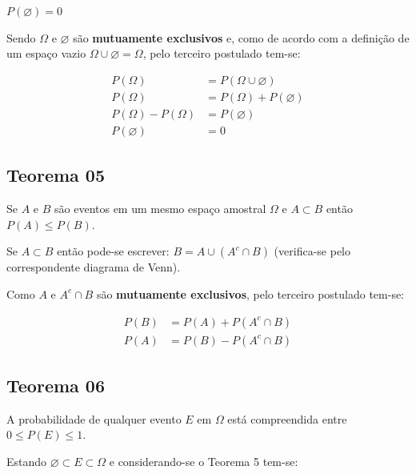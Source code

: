 \documentclass[
]{book}
\begin{document}
\(P(\varnothing)=0\)

\hfill\break

Sendo \(\Omega\) e \(\varnothing\) são \textbf{mutuamente exclusivos} e, como de acordo com a definição de um espaço vazio
\(\Omega \cup \varnothing = \Omega\), pelo terceiro postulado tem-se:

\hfill\break

\begin{align*}
P(\Omega) & = P(\Omega \cup \varnothing)\\ 
P(\Omega) & = P(\Omega) + P(\varnothing)\\ 
P(\Omega) - P(\Omega) & = P(\varnothing)\\ 
P(\varnothing) & =0
\end{align*}

\hfill\break

\hypertarget{teorema-05}{%
\subsection{Teorema 05}\label{teorema-05}}

Se \(A\) e \(B\) são eventos em um mesmo espaço amostral \(\Omega\) e \(A \subset B\) então \(P(A) \le P(B)\).

\hfill\break

Se \(A \subset B\) então pode-se escrever: \(B = A \cup (A^{c} \cap B)\) (verifica-se pelo correspondente diagrama de Venn).

\hfill\break

Como \(A\) e \(A^{c}\cap B\) são \textbf{mutuamente exclusivos}, pelo terceiro postulado tem-se:

\hfill\break

\begin{align*}
P(B) &  = P(A) + P(A^{c}\cap B) \\
P(A) & = P(B) - P(A^{c}\cap B)
\end{align*}

\hfill\break

\hypertarget{teorema-06}{%
\subsection{Teorema 06}\label{teorema-06}}

A probabilidade de qualquer evento \(E\) em \(\Omega\) está compreendida entre \(0 \le P(E) \le 1\).

\hfill\break

Estando \(\varnothing \subset E \subset \Omega\) e considerando-se o Teorema 5 tem-se:
\end{document}
